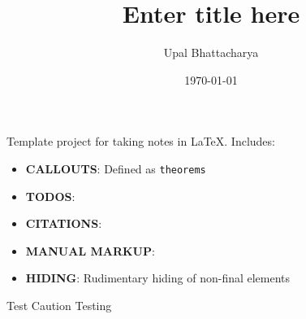 \documentclass[a4paper,colorinlistoftodos]{article}
\author{Upal Bhattacharya}
\date{\today}
\title{Enter title here}
\begin{document}
\maketitle

\begingroup
    \hypersetup{linkcolor=black}
    \tableofcontents
    \listoftodos
    \pagebreak
\endgroup

\linenumbers

Template project for taking notes in \LaTeX.
Includes:
\begin{itemize}
\item \textbf{CALLOUTS}: Defined as \verb|theorems|
\item \textbf{TODOS}:
\item \textbf{CITATIONS}: \cite{openai2024HelloGpt4o}
\item \textbf{MANUAL MARKUP}: 
\item \textbf{HIDING}: Rudimentary hiding of non-final elements
\end{itemize}

\begin{caution}{Test Caution}{}
Testing
\end{caution}




\end{document}
